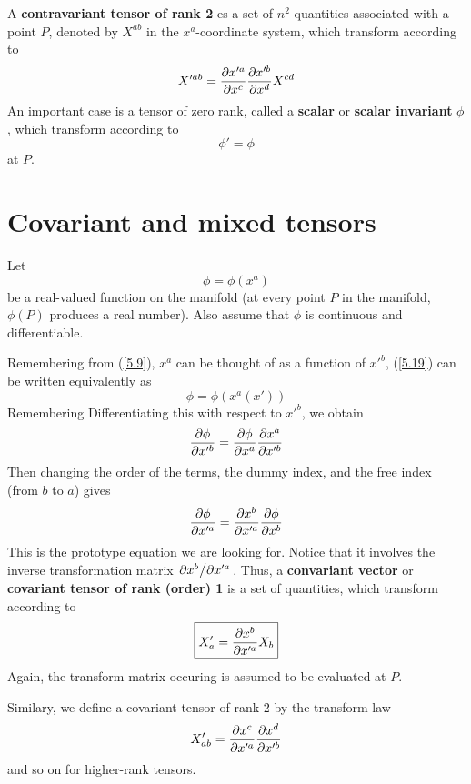 A \textbf{contravariant tensor of rank 2} es a set of $n^2$ quantities associated with a point $P$, denoted by $X^{ab}$ in the $x^{a}$-coordinate system, which transform according to 
\begin{equation}\label{5.17}
  X'^{ab}=\pdv{x'^{a}}{x^c}\pdv{x'^b}{x^d}X^{cd }
\end{equation}
An important case is a tensor of zero rank, called a \textbf{scalar} or \textbf{scalar invariant} $\phi$, which transform according to 
\begin{equation}\label{5.18}
  \boxed{\phi' =\phi}
\end{equation}
at $P$.

\section{Covariant and mixed tensors}
Let
\begin{equation}\label{5.19}
  \phi=\phi(x^{a})
\end{equation}
be a real-valued function on the manifold (at every point $P$ in the manifold, $\phi(P)$ produces a real number). Also assume that $\phi$ is continuous and differentiable.

Remembering from (\ref{5.9}), $x^{a}$ can be thought of as a function of $x'^b$, (\ref{5.19}) can be written equivalently as $$\phi=\phi(x^{a}(x'))$$ Remembering Differentiating this with respect to $x'^b$, we obtain 
\begin{equation*}
  \pdv{\phi}{x'^b}=\pdv{\phi}{x^{a}}\pdv{x^{a}}{x'^b }
\end{equation*}
Then changing the order of the terms, the dummy index, and the free index (from $b$ to $a$) gives
\begin{equation}\label{5.20}
  \pdv{\phi}{x'^{a}}=\pdv{x^b}{x'^{a}}\pdv{\phi}{x^b }
\end{equation}
This is the prototype equation we are looking for. Notice that it involves the inverse transformation matrix $\pdv*{x^b}{x'^{a}}$. Thus, a \textbf{convariant vector} or \textbf{covariant tensor of rank (order) 1} is a set of quantities, which transform according to 
\begin{equation}\label{5.21}
  \boxed{X'_a=\pdv{x^b}{x'^{a}}X_b}
\end{equation}
Again, the transform matrix occuring is assumed to be evaluated at $P$.

Similary, we define a covariant tensor of rank 2 by the transform law
\begin{equation}\label{5.22}
  X'_{ab} = \pdv{x^c}{x'^a}\pdv{x^d}{x'^b}
\end{equation}
and so on for higher-rank tensors.

